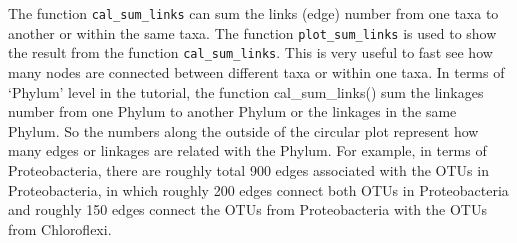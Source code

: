 \documentclass[
]{book}
\newenvironment{Shaded}{\begin{snugshade}}{\end{snugshade}}
\newcommand{\AttributeTok}[1]{\textcolor[rgb]{0.77,0.63,0.00}{#1}}
\newcommand{\CommentTok}[1]{\textcolor[rgb]{0.56,0.35,0.01}{\textit{#1}}}
\newcommand{\ConstantTok}[1]{\textcolor[rgb]{0.00,0.00,0.00}{#1}}
\newcommand{\DecValTok}[1]{\textcolor[rgb]{0.00,0.00,0.81}{#1}}
\newcommand{\FunctionTok}[1]{\textcolor[rgb]{0.00,0.00,0.00}{#1}}
\newcommand{\NormalTok}[1]{#1}
\newcommand{\OtherTok}[1]{\textcolor[rgb]{0.56,0.35,0.01}{#1}}
\newcommand{\SpecialCharTok}[1]{\textcolor[rgb]{0.00,0.00,0.00}{#1}}
\newcommand{\StringTok}[1]{\textcolor[rgb]{0.31,0.60,0.02}{#1}}
\begin{document}
\begin{Shaded}
\end{Shaded}

The function \texttt{cal\_sum\_links} can sum the links (edge) number from one taxa to another or within the same taxa.
The function \texttt{plot\_sum\_links} is used to show the result from the function \texttt{cal\_sum\_links}.
This is very useful to fast see how many nodes are connected between different taxa or within one taxa.
In terms of `Phylum' level in the tutorial, the function cal\_sum\_links() sum the linkages number from one Phylum to another Phylum or the linkages in the same Phylum.
So the numbers along the outside of the circular plot represent how many edges or linkages are related with the Phylum.
For example, in terms of Proteobacteria, there are roughly total 900 edges associated with the OTUs in Proteobacteria,
in which roughly 200 edges connect both OTUs in Proteobacteria and roughly 150 edges connect the OTUs from Proteobacteria with the OTUs from Chloroflexi.
\end{document}
